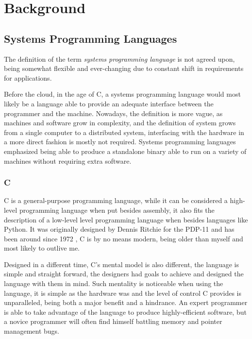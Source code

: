 

\chapter{Background}\label{cha:background}

\section{Systems Programming Languages}\label{sec:systems-programming}

The definition of the term \emph{systems programming language} is not agreed upon,
being somewhat flexible and ever-changing due to constant shift in requirements for applications.

Before the cloud, in the age of C, a systems programming language would
most likely be a language able to provide an adequate interface between the programmer and the machine.
Nowadays, the definition is more vague, as machines and software grow in complexity,
and the definition of system grows from a single computer to a distributed system,
interfacing with the hardware in a more direct fashion is mostly not required.
Systems programming languages emphasized being able to produce a standalone
binary able to run on a variety of machines without requiring extra software.

\subsection{C}
C is a general-purpose programming language, while it can be considered a high-level programming language
when put besides assembly, it also fits the description of a low-level level programming language when besides languages like Python.
It was originally designed by Dennis Ritchie for the PDP-11 and has been around since 1972 \autocite{Kernighan1988},
C is by no means modern, being older than myself and most likely to outlive me.

Designed in a different time, C's mental model is also different, the language is simple and straight forward,
the designers had goals to achieve and designed the language with them in mind.
Such mentality is noticeable when using the language,
it is simple as the hardware was and the level of control C provides is unparalleled,
being both a major benefit and a hindrance.
An expert programmer is able to take advantage of the language to produce highly-efficient software,
but a novice programmer will often find himself battling memory and pointer management bugs.

